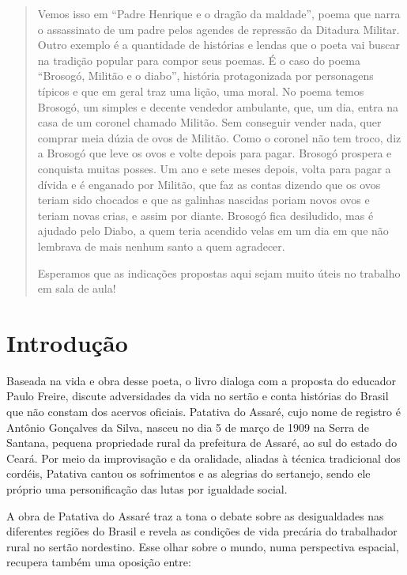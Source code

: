 \documentclass[12pt]{extarticle}
\begin{document}
\begin{abstract}
Vemos isso em ``Padre Henrique e o dragão da maldade'', poema que narra 
o assassinato de um padre pelos agendes de repressão da Ditadura Militar. 
Outro exemplo é a quantidade de histórias e lendas que o poeta vai buscar 
na tradição popular para compor seus poemas. É o caso do poema ``Brosogó, 
Militão e o diabo'', história protagonizada por personagens típicos e 
que em geral traz uma lição, uma moral. No poema temos Brosogó, um simples 
e decente vendedor ambulante, que, um dia, entra na casa de um coronel 
chamado Militão. Sem conseguir vender nada, quer comprar meia dúzia de 
ovos de Militão. Como o coronel não tem troco, diz a Brosogó que leve os 
ovos e volte depois para pagar. Brosogó prospera e conquista muitas posses. 
Um ano e sete meses depois, volta para pagar a dívida e é enganado por 
Militão, que faz as contas dizendo que os ovos teriam sido chocados e 
que as galinhas nascidas poriam novos ovos e teriam novas crias, e assim 
por diante. Brosogó fica desiludido, mas é ajudado pelo Diabo, a quem 
teria acendido velas em um dia em que não lembrava de mais nenhum santo 
a quem agradecer.

Esperamos que as indicações propostas aqui sejam muito úteis no trabalho em
sala de aula!



\end{abstract}

\tableofcontents


\section{Introdução}

Baseada na vida e obra desse poeta, o livro dialoga com a proposta do 
educador Paulo Freire, discute adversidades da vida no sertão e conta 
histórias do Brasil que não constam dos acervos oficiais. Patativa do Assaré, 
cujo nome de registro é Antônio Gonçalves da Silva, nasceu no dia 5 de 
março de 1909 na Serra de Santana, pequena propriedade rural da prefeitura 
de Assaré, ao sul do estado do Ceará. Por meio da improvisação e da 
oralidade, aliadas à técnica tradicional dos cordéis, Patativa cantou os 
sofrimentos e as alegrias do sertanejo, sendo ele próprio uma personificação 
das lutas por igualdade social.

A obra de Patativa do Assaré traz a tona o debate sobre as desigualdades 
nas diferentes regiões do Brasil e revela as condições de vida precária do trabalhador rural no sertão nordestino. Esse olhar sobre o mundo, numa 
perspectiva espacial, recupera também uma oposição entre:
\end{document}
